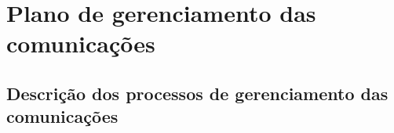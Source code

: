 
\chapter{Plano de gerenciamento das comunicações}
\label{ch:communication-management-plan}


\section{Descrição dos processos de gerenciamento das comunicações}